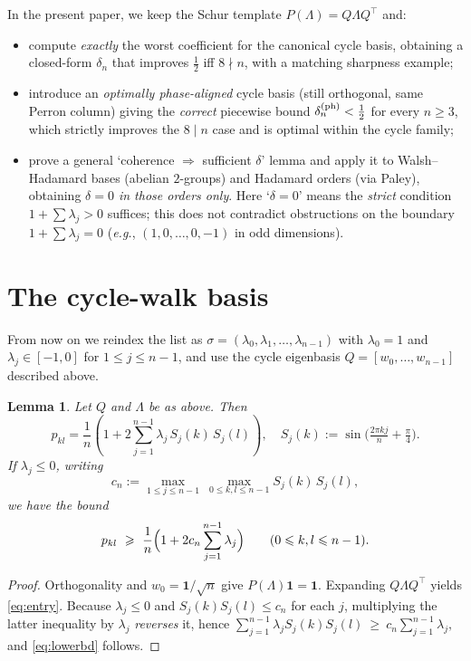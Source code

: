 \documentclass[12pt,fleqn]{amsart}
\renewcommand{\le}{\leqslant}
\renewcommand{\ge}{\geqslant}
\newtheorem{lem}[thm]{Lemma}
\theoremstyle{remark}
\newcommand{\1}{\mathbf{1}}
\newcommand{\Lam}{\Lambda}
\begin{document}
\medskip
In the present paper, we keep the Schur template $P(\Lam)=Q\Lam Q^\top$ and:
\begin{itemize}
\item compute \emph{exactly} the worst coefficient for the canonical cycle basis, obtaining a closed-form $\delta_n$ that improves $\tfrac12$ iff $8\nmid n$, with a matching sharpness example;
\item introduce an \emph{optimally phase-aligned} cycle basis (still orthogonal, same Perron column) giving the \emph{correct} piecewise bound $\delta_n^{\rm (ph)}<\tfrac12$ for every $n\ge3$, which strictly improves the $8\mid n$ case and is optimal within the cycle family;
\item prove a general `coherence $\Rightarrow$ sufficient $\delta$' lemma and apply it to Walsh--Hadamard bases (abelian $2$-groups) and Hadamard orders (via Paley), obtaining \emph{$\delta=0$ in those orders only}. Here `$\delta=0$' means the \emph{strict} condition $1+\sum\lambda_j>0$ suffices; this does not contradict obstructions on the boundary $1+\sum\lambda_j=0$ (\emph{e.g.}, $(1,0,\dots,0,-1)$ in odd dimensions).
\end{itemize}

\section{The cycle-walk basis}\label{sec:cycle}
From now on we reindex the list as $\sigma=(\lambda_0,\lambda_1,\ldots,\lambda_{n-1})$ with $\lambda_0=1$ and $\lambda_j\in[-1,0]$ for $1\le j\le n-1$, and use the cycle eigenbasis $Q=[w_0,\dots,w_{n-1}]$ described above.

\begin{lem}\label{lem:entrybound}
Let $Q$ and $\Lam$ be as above. Then
\begin{equation}\label{eq:entry}
p_{kl}
=\frac1n\!\left(1+2\sum_{j=1}^{n-1}\lambda_j\,S_j(k)\,S_j(l)\right),
\quad
S_j(k):=\sin\!\Big(\tfrac{2\pi kj}{n}+\tfrac{\pi}{4}\Big).
\end{equation}
If $\lambda_j\le 0$, writing
\[
c_n:=\max_{1\le j\le n-1}\ \max_{0\le k,l\le n-1} S_j(k)\,S_j(l),
\]
we have the bound
\begin{equation}\label{eq:lowerbd}
p_{kl}\ \ge\ \frac1n\Bigl(1+2c_n\sum_{j=1}^{n-1}\lambda_j\Bigr)\qquad(0 \le k, l \le n-1).
\end{equation}
\end{lem}

\begin{proof}
Orthogonality and $w_0=\1/\sqrt n$ give $P(\Lam)\1=\1$. Expanding $Q\Lam Q^\top$ yields \eqref{eq:entry}. Because $\lambda_j\le0$ and $S_j(k)S_j(l)\le c_n$ for each $j$, multiplying the latter inequality by $\lambda_j$ \emph{reverses} it, hence
\(
\sum_{j=1}^{n-1}\lambda_j S_j(k)S_j(l)\ \ge\ c_n\sum_{j=1}^{n-1}\lambda_j,
\)
and \eqref{eq:lowerbd} follows.
\end{proof}
\end{document}
